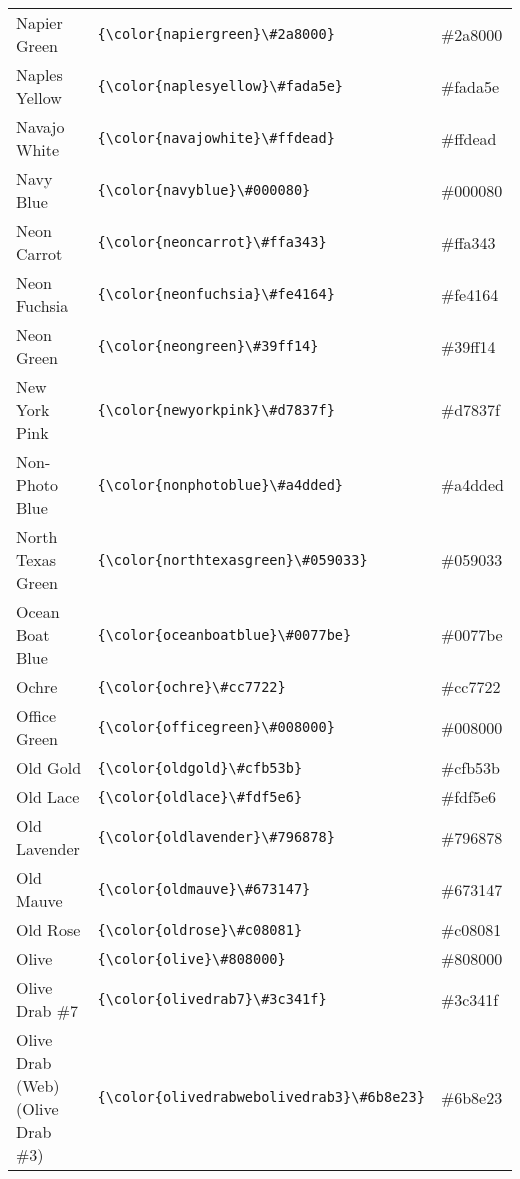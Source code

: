 \documentclass[9.5pt]{article}
\begin{document}
\begin{longtable}{l | l | l}
	Napier Green & \verb!{\color{napiergreen}\#2a8000}! & {\color{napiergreen}\#2a8000}\\
	Naples Yellow & \verb!{\color{naplesyellow}\#fada5e}! & {\color{naplesyellow}\#fada5e}\\
	Navajo White & \verb!{\color{navajowhite}\#ffdead}! & {\color{navajowhite}\#ffdead}\\
	Navy Blue & \verb!{\color{navyblue}\#000080}! & {\color{navyblue}\#000080}\\
	Neon Carrot & \verb!{\color{neoncarrot}\#ffa343}! & {\color{neoncarrot}\#ffa343}\\
	Neon Fuchsia & \verb!{\color{neonfuchsia}\#fe4164}! & {\color{neonfuchsia}\#fe4164}\\
	Neon Green & \verb!{\color{neongreen}\#39ff14}! & {\color{neongreen}\#39ff14}\\
	New York Pink & \verb!{\color{newyorkpink}\#d7837f}! & {\color{newyorkpink}\#d7837f}\\
	Non-Photo Blue & \verb!{\color{nonphotoblue}\#a4dded}! & {\color{nonphotoblue}\#a4dded}\\
	North Texas Green & \verb!{\color{northtexasgreen}\#059033}! & {\color{northtexasgreen}\#059033}\\
	Ocean Boat Blue & \verb!{\color{oceanboatblue}\#0077be}! & {\color{oceanboatblue}\#0077be}\\
	Ochre & \verb!{\color{ochre}\#cc7722}! & {\color{ochre}\#cc7722}\\
	Office Green & \verb!{\color{officegreen}\#008000}! & {\color{officegreen}\#008000}\\
	Old Gold & \verb!{\color{oldgold}\#cfb53b}! & {\color{oldgold}\#cfb53b}\\
	Old Lace & \verb!{\color{oldlace}\#fdf5e6}! & {\color{oldlace}\#fdf5e6}\\
	Old Lavender & \verb!{\color{oldlavender}\#796878}! & {\color{oldlavender}\#796878}\\
	Old Mauve & \verb!{\color{oldmauve}\#673147}! & {\color{oldmauve}\#673147}\\
	Old Rose & \verb!{\color{oldrose}\#c08081}! & {\color{oldrose}\#c08081}\\
	Olive & \verb!{\color{olive}\#808000}! & {\color{olive}\#808000}\\
	Olive Drab \#7 & \verb!{\color{olivedrab7}\#3c341f}! & {\color{olivedrab7}\#3c341f}\\
	Olive Drab (Web) (Olive Drab \#3) & \verb!{\color{olivedrabwebolivedrab3}\#6b8e23}! & {\color{olivedrabwebolivedrab3}\#6b8e23}\\

\end{longtable}
\end{document}
